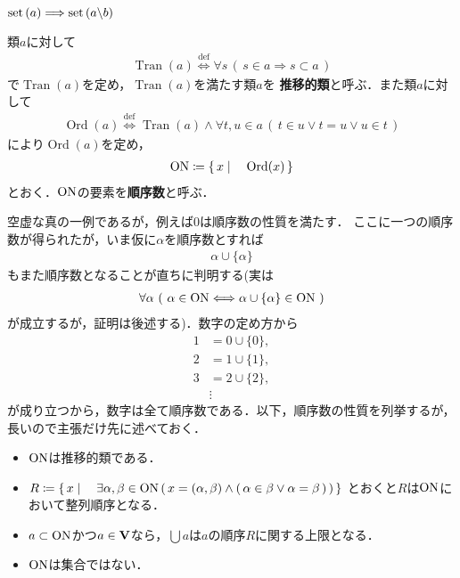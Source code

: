 	$\operatorname*{set} \left(a\right) \Longrightarrow \operatorname*{set} \left(a \backslash b\right)$
	
	\begin{screen}
		\begin{dfn}[順序数]
			類$a$に対して
			\begin{align}
				\operatorname{Tran}(a) \overset{\mathrm{def}}{\Longleftrightarrow}
				\forall s\, (\, s \in a \Longrightarrow s \subset a\, )
			\end{align}
			で$\operatorname{Tran}(a)$を定め，$\operatorname{Tran}(a)$を満たす類$a$を
			{\bf 推移的類}と呼ぶ．また類$a$に対して
			\begin{align}
				\operatorname{Ord}(a) \overset{\mathrm{def}}{\Longleftrightarrow}
				\operatorname{Tran}(a)
				\wedge \forall t,u \in a\, (\, t \in u \vee t = u \vee u \in t\, )
			\end{align}
			により$\operatorname{Ord}(a)$を定め，
			\begin{align}
				\mathrm{ON} \coloneqq \left\{\, x \mid \quad \operatorname{Ord}(x)\, \right\}
			\end{align}
			とおく．$\mathrm{ON}$の要素を{\bf 順序数}と呼ぶ．
		\end{dfn}
	\end{screen}
	
	空虚な真の一例であるが，例えば$0$は順序数の性質を満たす．
	ここに一つの順序数が得られたが，いま仮に$\alpha$を順序数とすれば
	\begin{align}
		\alpha \cup \{\alpha\}
	\end{align}
	もまた順序数となることが直ちに判明する(実は
	\begin{align}
		\forall \alpha\ (\ \alpha \in \mathrm{ON} \Longleftrightarrow \alpha \cup \{\alpha\} \in \mathrm{ON}\ )
	\end{align}
	が成立するが，証明は後述する)．数字の定め方から
	\begin{align}
		1 &= 0 \cup \{0\}, \\
		2 &= 1 \cup \{1\}, \\
		3 &= 2 \cup \{2\}, \\
		&\vdots
	\end{align}
	が成り立つから，数字は全て順序数である．以下，順序数の性質を列挙するが，長いので主張だけ先に述べておく．
	\begin{itemize}
		\item $\mathrm{ON}$は推移的類である．
		\item $R \coloneqq \left\{\, x \mid \quad \exists \alpha,\beta \in \mathrm{ON}\, 
			(\, x=(\alpha,\beta) \wedge (\, \alpha \in \beta \vee \alpha = \beta\, )\, )\, \right\}$
			とおくと$R$は$\mathrm{ON}$において整列順序となる．
		\item $a \subset \mathrm{ON}$かつ$a \in \mathbf{V}$なら，$\bigcup a$は$a$の順序$R$に関する上限となる．
		\item $\mathrm{ON}$は集合ではない．
	\end{itemize}
	
